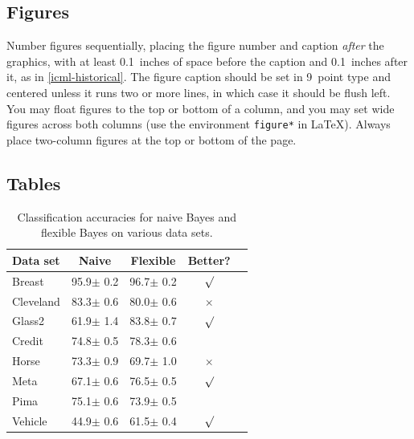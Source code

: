 \documentclass{article}
\theoremstyle{plain}
\theoremstyle{definition}
\theoremstyle{remark}
\begin{document}
\subsection{Figures}

Number figures sequentially, placing the figure number and caption
\emph{after} the graphics, with at least 0.1~inches of space before
the caption and 0.1~inches after it, as in
\cref{icml-historical}. The figure caption should be set in
9~point type and centered unless it runs two or more lines, in which
case it should be flush left. You may float figures to the top or
bottom of a column, and you may set wide figures across both columns
(use the environment \texttt{figure*} in \LaTeX). Always place
two-column figures at the top or bottom of the page.


\subsection{Tables}



\begin{table}[t]
\caption{Classification accuracies for naive Bayes and flexible
Bayes on various data sets.}
\label{sample-table}
\vskip 0.15in
\begin{center}
\begin{small}
\begin{sc}
\begin{tabular}{lcccr}
\toprule
Data set & Naive & Flexible & Better? \\
\midrule
Breast    & 95.9$\pm$ 0.2& 96.7$\pm$ 0.2& $\surd$ \\
Cleveland & 83.3$\pm$ 0.6& 80.0$\pm$ 0.6& $\times$\\
Glass2    & 61.9$\pm$ 1.4& 83.8$\pm$ 0.7& $\surd$ \\
Credit    & 74.8$\pm$ 0.5& 78.3$\pm$ 0.6&         \\
Horse     & 73.3$\pm$ 0.9& 69.7$\pm$ 1.0& $\times$\\
Meta      & 67.1$\pm$ 0.6& 76.5$\pm$ 0.5& $\surd$ \\
Pima      & 75.1$\pm$ 0.6& 73.9$\pm$ 0.5&         \\
Vehicle   & 44.9$\pm$ 0.6& 61.5$\pm$ 0.4& $\surd$ \\
\bottomrule
\end{tabular}
\end{sc}
\end{small}
\end{center}
\vskip -0.1in
\end{table}
\end{document}
